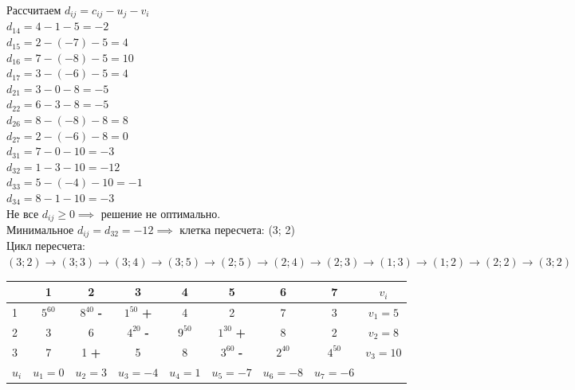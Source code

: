 \begin{flushleft}
Рассчитаем $d_{ij} = c_{ij} - u_{j} - v_{i}$\\
$d_{14} = 4 - 1 - 5 = -2$\\
$d_{15} = 2 - (-7) - 5 = 4$\\
$d_{16} = 7 - (-8) - 5 = 10$\\
$d_{17} = 3 - (-6) - 5 = 4$\\
$d_{21} = 3 - 0 - 8 = -5$\\
$d_{22} = 6 - 3 - 8 = -5$\\
$d_{26} = 8 - (-8) - 8 = 8$\\
$d_{27} = 2 - (-6) - 8 = 0$\\
$d_{31} = 7 - 0 - 10 = -3$\\
$d_{32} = 1 - 3 - 10 = -12$\\
$d_{33} = 5 - (-4) - 10 = -1$\\
$d_{34} = 8 - 1 - 10 = -3$\\
Не все $d_{ij} \ge 0 \implies$ решение не оптимально.\\
Минимальное $d_{ij} = d_{32} = -12 \implies$ клетка пересчета: (3; 2)\\
Цикл пересчета:\\
$(3; 2) \rightarrow (3; 3) \rightarrow (3; 4) \rightarrow (3; 5) \rightarrow (2; 5) \rightarrow (2; 4) \rightarrow (2; 3) \rightarrow (1; 3) \rightarrow (1; 2) \rightarrow (2; 2) \rightarrow (3; 2)$
\end{flushleft}

\begin{center}
    \begin{tabular}{|a | c | c | c | c | c | c | c | c|} 
         \hline
            & 1 & 2 & 3 & 4 & 5 & 6 & 7 & $v_{i}$\\
          &  $5^{60}$ &  $8^{40}$ {\bf-} &  $1^{50}$ {\bf+} & 4 & 2 & 7 & 3 & $v_1 = 5$\\
          & 3 & 6 &  $4^{20}$ {\bf-} &  $9^{50}$ &  $1^{30}$ {\bf+} & 8 & 2 & $v_2 = 8$\\
          & 7 & 1 {\bf+} & 5 & 8 &  $3^{60}$ {\bf-} &  $2^{40}$ &  $4^{50}$ & $v_3 = 10$\\
         \hline
            $u_{i}$ & $u_1 = 0$ & $u_2 = 3$ & $u_3 = -4$ & $u_4 = 1$ & $u_5 = -7$ & $u_6 = -8$ & $u_7 = -6$ & \\
        \hline
    \end{tabular}
\end{center}

